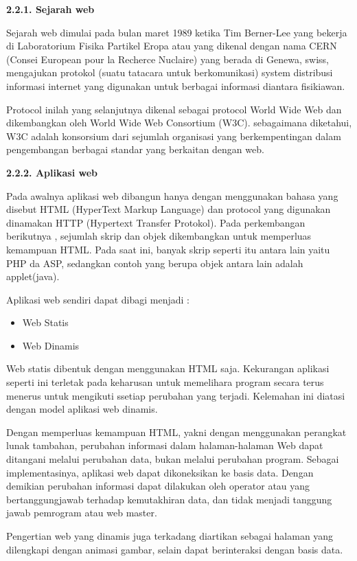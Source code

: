 \documentclass[11pt]{article}
\begin{document}
\textbf{2.2.1. Sejarah web}

Sejarah web dimulai pada bulan maret 1989 ketika Tim Berner-Lee yang bekerja di Laboratorium Fisika Partikel Eropa atau yang dikenal dengan nama CERN (Consei European pour la Recherce Nuclaire) yang berada di Genewa, swiss, mengajukan protokol (suatu tatacara untuk berkomunikasi) system distribusi informasi internet yang digunakan untuk berbagai informasi diantara fisikiawan.

Protocol inilah yang selanjutnya dikenal sebagai protocol World Wide Web dan dikembangkan oleh World Wide Web Consortium (W3C). sebagaimana diketahui, W3C adalah konsorsium dari sejumlah organisasi yang berkempentingan dalam pengembangan berbagai standar yang berkaitan dengan web.


\textbf{2.2.2. Aplikasi web}

Pada awalnya aplikasi web dibangun hanya dengan menggunakan bahasa yang disebut HTML (HyperText Markup Language) dan protocol yang digunakan dinamakan HTTP (Hypertext Transfer Protokol). Pada perkembangan berikutnya , sejumlah skrip dan objek dikembangkan untuk memperluas kemampuan HTML. Pada saat ini, banyak skrip seperti itu antara lain yaitu PHP da ASP, sedangkan contoh yang berupa objek antara lain adalah applet(java).

Aplikasi web sendiri dapat dibagi menjadi :

\begin{itemize}
	\item Web Statis
	\item Web Dinamis
\end{itemize}

Web statis dibentuk dengan menggunakan HTML saja. Kekurangan aplikasi seperti ini terletak pada keharusan untuk memelihara program secara terus menerus untuk mengikuti ssetiap perubahan yang terjadi. Kelemahan ini diatasi dengan model aplikasi web dinamis.

Dengan memperluas kemampuan HTML, yakni dengan menggunakan perangkat lunak tambahan, perubahan informasi dalam halaman-halaman Web dapat ditangani melalui perubahan data, bukan melalui perubahan program. Sebagai implementasinya, aplikasi web dapat dikoneksikan ke basis data. Dengan demikian perubahan informasi dapat dilakukan oleh operator atau yang bertanggungjawab terhadap kemutakhiran data, dan tidak menjadi tanggung jawab pemrogram atau web master.


Pengertian web yang dinamis juga terkadang diartikan sebagai halaman yang dilengkapi dengan animasi gambar, selain dapat berinteraksi dengan basis data.
\end{document}
